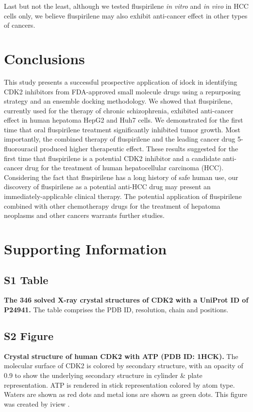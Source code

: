 \documentclass[10pt,letterpaper]{article}
\begin{document}
Last but not the least, although we tested fluspirilene \textit{in vitro} and \textit{in vivo} in HCC cells only, we believe fluspirilene may also exhibit anti-cancer effect in other types of cancers.

\section*{Conclusions}

This study presents a successful prospective application of idock \cite{1153,1362} in identifying CDK2 inhibitors from FDA-approved small molecule drugs using a repurposing strategy and an ensemble docking methodology. We showed that fluspirilene, currently used for the therapy of chronic schizophrenia, exhibited anti-cancer effect in human hepatoma HepG2 and Huh7 cells. We demonstrated for the first time that oral fluspirilene treatment significantly inhibited tumor growth. Most importantly, the combined therapy of fluspirilene and the leading cancer drug 5-fluorouracil produced higher therapeutic effect. These results suggested for the first time that fluspirilene is a potential CDK2 inhibitor and a candidate anti-cancer drug for the treatment of human hepatocellular carcinoma (HCC). Considering the fact that fluspirilene has a long history of safe human use, our discovery of fluspirilene as a potential anti-HCC drug may present an immediately-applicable clinical therapy. The potential application of fluspirilene combined with other chemotherapy drugs for the treatment of hepatoma neoplasms and other cancers warrants further studies.

\section*{Supporting Information}


\subsection*{S1 Table}
\label{S1_Table}
{\bf The 346 solved X-ray crystal structures of CDK2 with a UniProt ID of P24941.} The table comprises the PDB ID, resolution, chain and positions.%

\subsection*{S2 Figure}
\label{S2_Figure}
{\bf Crystal structure of human CDK2 with ATP (PDB ID: 1HCK).} The molecular surface of CDK2 is colored by secondary structure, with an opacity of 0.9 to show the underlying secondary structure in cylinder \& plate representation. ATP is rendered in stick representation colored by atom type. Waters are shown as red dots and metal ions are shown as green dots. This figure was created by iview \cite{1366}.%
\end{document}
